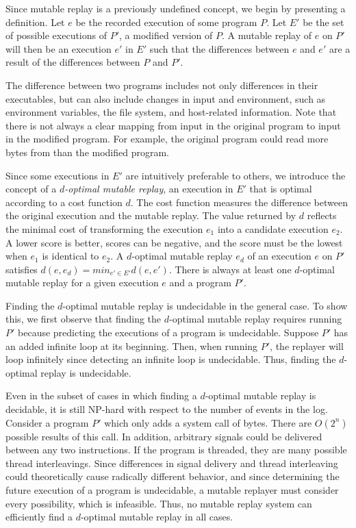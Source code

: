 Since mutable replay is a previously undefined concept, we begin by
presenting a definition.  Let $e$ be the recorded execution of some
program $P$. Let $E'$ be the set of possible executions of $P'$, a
modified version of $P$. A mutable replay of $e$ on $P'$ will then be
an execution $e'$ in $E'$ such that the differences between $e$ and
$e'$ are a result of the differences between $P$ and $P'$.

The difference between two programs includes not only differences in
their executables, but can also include changes in input and
environment, such as environment variables, the file system,
and host-related information.
Note that there is
not always a clear mapping from input in the original program to input
in the modified program. For example, the original program could read more bytes
from  than the modified program.

Since some executions in $E'$ are intuitively preferable to others, we introduce the
concept of a \emph{$d$-optimal mutable replay}, an execution in $E'$
that is optimal according to a cost function $d$.  The cost function
measures the difference between the original execution
and the mutable replay.  The value returned by $d$ reflects the minimal cost
of transforming the execution $e_1$ into a candidate execution
$e_2$. A lower score is better, scores can be negative, and the score
must be the lowest when $e_1$ is identical to $e_2$. A $d$-optimal
mutable replay $e_{d}$ of an execution $e$ on $P'$ satisfies $d(e, e_{d}) = min_{e' \in E'}
d(e, e')$. There is always at least one $d$-optimal mutable replay for
a given execution $e$ and a program $P'$.

Finding the $d$-optimal mutable replay is undecidable in the general
case. To show this, we first observe that finding the $d$-optimal mutable
replay requires running $P'$ because predicting the executions of a
program is undecidable. Suppose $P'$ has an added infinite loop at its
beginning. Then, when running $P'$, the replayer will loop infinitely
since detecting an infinite loop is undecidable. Thus, finding the $d$-optimal
replay is undecidable.

Even in the subset of cases in which finding a $d$-optimal mutable
replay is decidable, it is still NP-hard with respect to the number of events in
the log. Consider a program $P'$
which only adds a  system call of  bytes. There are
$O(2^{n})$ possible results of this call. In addition, arbitrary signals could be
delivered between any two instructions. If the program is threaded,
they are many possible thread interleavings. Since
differences in signal delivery and thread interleaving could
theoretically cause radically different behavior, and since determining the
future execution of a program is undecidable, a mutable replayer must
consider every possibility, which is infeasible. Thus, no mutable replay system
can efficiently find a $d$-optimal mutable replay in all cases.

